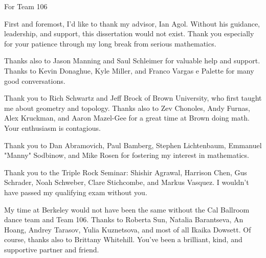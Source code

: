 \documentclass{ucbthesis}
\begin{document}
\begin{frontmatter}

\begin{dedication}
\null\vfil
\begin{center}



For Team 106\\\vspace{12pt}


\end{center} \vfil\null \end{dedication}


\tableofcontents
\clearpage
\listoffigures
\clearpage
\listoftables

\begin{acknowledgements}

First and foremost, I'd like to thank my advisor, Ian Agol. Without his
guidance, leadership, and support, this dissertation would not exist. Thank you
especially for your patience through my long break from serious mathematics.


Thanks also to Jason Manning and Saul Schleimer for valuable help and support.
Thanks to Kevin Donaghue, Kyle Miller, and Franco Vargas e Palette for many
good conversations.

Thank you to Rich Schwartz and Jeff Brock of Brown University, who first taught
me about geometry and topology. Thanks also to Zev Chonoles, Andy Furnas, Alex
Kruckman, and Aaron Mazel-Gee for a great time at Brown doing math. Your
enthusiasm is contagious.

Thank you to Dan Abramovich, Paul Bamberg, Stephen Lichtenbaum, Emmanuel
"Manny" Sodbinow, and Mike Rosen for fostering my interest in mathematics.

Thank you to the Triple Rock Seminar: Shishir Agrawal, Harrison Chen, Gus
Schrader, Noah Schweber, Clare Stichcombe, and Markus Vasquez. I wouldn't have
passed my qualifying exam without you.

My time at Berkeley would not have been the same without the Cal Ballroom dance
team and Team 106. Thanks to Roberta Sun, Natalia Barantseva, An Hoang, Andrey
Tarasov, Yulia Kuznetsova, and most of all Ikaika Dowsett. Of course, thanks
also to Brittany Whitehill. You've been a brilliant, kind, and supportive
partner and friend.


\end{acknowledgements}
\end{frontmatter}
\end{document}
